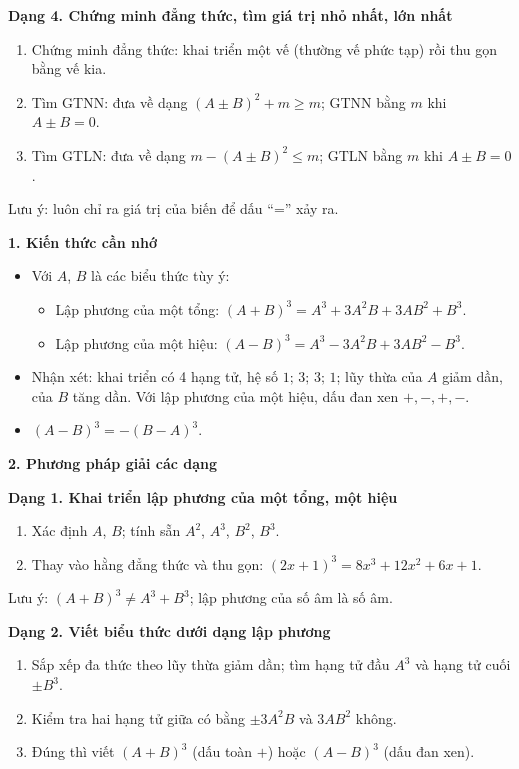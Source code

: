 \textbf{Dạng 4. Chứng minh đẳng thức, tìm giá trị nhỏ nhất, lớn nhất}
\begin{enumerate}
\item Chứng minh đẳng thức: khai triển một vế (thường vế phức tạp) rồi thu gọn bằng vế kia.
\item Tìm GTNN: đưa về dạng $(A\pm B)^2+m\ge m$; GTNN bằng $m$ khi $A\pm B=0$.
\item Tìm GTLN: đưa về dạng $m-(A\pm B)^2\le m$; GTLN bằng $m$ khi $A\pm B=0$.
\end{enumerate}
Lưu ý: luôn chỉ ra giá trị của biến để dấu ``='' xảy ra.

\par{}\par\smallskip
\textbf{1. Kiến thức cần nhớ}
\begin{itemize}
\item Với $A$, $B$ là các biểu thức tùy ý:
\begin{itemize}
\item Lập phương của một tổng: $\boxed{(A+B)^3=A^3+3A^2B+3AB^2+B^3}$.
\item Lập phương của một hiệu: $\boxed{(A-B)^3=A^3-3A^2B+3AB^2-B^3}$.
\end{itemize}
\item Nhận xét: khai triển có 4 hạng tử, hệ số $1;\,3;\,3;\,1$; lũy thừa của $A$ giảm dần, của $B$ tăng dần. Với lập phương của một hiệu, dấu đan xen $+,-,+,-$.
\item $(A-B)^3=-(B-A)^3$.
\end{itemize}

\textbf{2. Phương pháp giải các dạng}

\textbf{Dạng 1. Khai triển lập phương của một tổng, một hiệu}
\begin{enumerate}
\item Xác định $A$, $B$; tính sẵn $A^2$, $A^3$, $B^2$, $B^3$.
\item Thay vào hằng đẳng thức và thu gọn: $(2x+1)^3=8x^3+12x^2+6x+1$.
\end{enumerate}
Lưu ý: $(A+B)^3\ne A^3+B^3$; lập phương của số âm là số âm.

\textbf{Dạng 2. Viết biểu thức dưới dạng lập phương}
\begin{enumerate}
\item Sắp xếp đa thức theo lũy thừa giảm dần; tìm hạng tử đầu $A^3$ và hạng tử cuối $\pm B^3$.
\item Kiểm tra hai hạng tử giữa có bằng $\pm 3A^2B$ và $3AB^2$ không.
\item Đúng thì viết $(A+B)^3$ (dấu toàn $+$) hoặc $(A-B)^3$ (dấu đan xen).
\end{enumerate}

